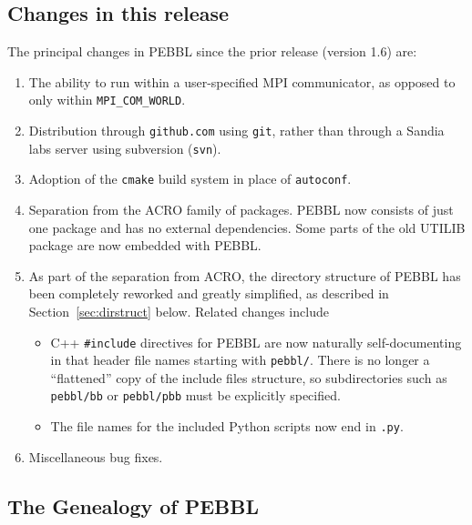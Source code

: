 \subsection{Changes in this release}
The principal changes in PEBBL since the prior release (version 1.6) are:
\begin{enumerate}
\item The ability to run within a user-specified MPI communicator, as opposed
to only within \texttt{MPI\_COM\_WORLD}.
\item Distribution through \texttt{github.com} using \texttt{git}, rather than
through a Sandia labs server using subversion (\texttt{svn}).
\item Adoption of the \texttt{cmake} build system in place of \texttt{autoconf}.
\item Separation from the ACRO family of packages.  PEBBL now consists of just
one package and has no external dependencies.  Some parts of the old UTILIB
package are now embedded with PEBBL.
\item As part of the separation from ACRO, the directory structure of PEBBL
has been completely reworked and greatly simplified, as described in
Section~\ref{sec:dirstruct} below.  Related changes include
\begin{itemize}
\item C++ \texttt{\#include} directives for PEBBL are now naturally
self-documenting in that header file names starting with \texttt{pebbl/}.
There is no longer a ``flattened'' copy of the include files structure, so
subdirectories such as \texttt{pebbl/bb} or \texttt{pebbl/pbb} must be
explicitly specified.
\item The file names for the included Python scripts now end in \texttt{.py}.
\end{itemize}
\item Miscellaneous bug fixes.
\end{enumerate}


\subsection{The Genealogy of PEBBL}

